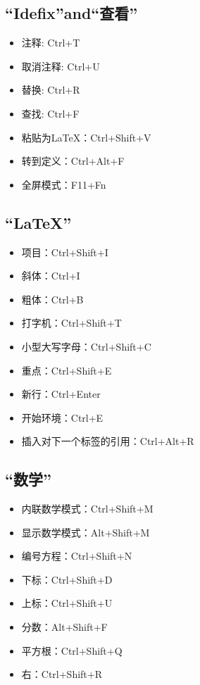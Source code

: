\documentclass[12pt]{ctexart}
\begin{document}
\subsection{“Idefix”and“查看”}
\begin{itemize}
	\item 注释:	Ctrl+T	
	\item 取消注释: Ctrl+U	
	\item 替换:	Ctrl+R
	\item 查找:	Ctrl+F
	\item 粘贴为LaTeX：Ctrl+Shift+V
	\item 转到定义：Ctrl+Alt+F
	\item 全屏模式：F11+Fn
\end{itemize}

\subsection{“LaTeX”}
\begin{itemize}
	\item 项目：Ctrl+Shift+I	
	\item 斜体：Ctrl+I
	\item 粗体：Ctrl+B
	\item 打字机：Ctrl+Shift+T
	\item 小型大写字母：Ctrl+Shift+C
	\item 重点：Ctrl+Shift+E
	\item 新行：Ctrl+Enter	
	\item 开始{环境}：Ctrl+E
	\item 插入对下一个标签的引用：Ctrl+Alt+R
\end{itemize}

\subsection{“数学”}
\begin{itemize}
	\item 内联数学模式：Ctrl+Shift+M
	\item 显示数学模式：Alt+Shift+M
	\item 编号方程：Ctrl+Shift+N
	\item 下标：Ctrl+Shift+D
	\item 上标：Ctrl+Shift+U
	\item 分数：Alt+Shift+F 
	\item 平方根：Ctrl+Shift+Q
	\item 右：Ctrl+Shift+R 
\end{itemize}
\end{document}
